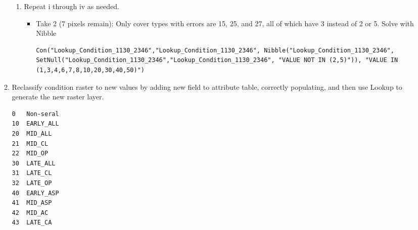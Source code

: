 \begin{enumerate}
\begin{enumerate}
\begin{enumerate}
            \item Repeat i through iv as needed.
            \begin{itemize}
            \item Take 2 (7 pixels remain): Only cover types with errors are 15, 25, and 27, all of which have 3 instead of 2 or 5. Solve with Nibble\begin{lstlisting}
Con("Lookup_Condition_1130_2346","Lookup_Condition_1130_2346", Nibble("Lookup_Condition_1130_2346", SetNull("Lookup_Condition_1130_2346","Lookup_Condition_1130_2346", "VALUE NOT IN (2,5)")), "VALUE IN (1,3,4,6,7,8,10,20,30,40,50)") \end{lstlisting}
            \end{itemize}
        \end{enumerate}  
        \item Reclassify condition raster to new values by adding new field to attribute table, correctly populating, and then use Lookup to generate the new raster layer.
        \begin{verbatim}
0   Non-seral
10  EARLY_ALL
20  MID_ALL
21  MID_CL
22  MID_OP
30  LATE_ALL
31  LATE_CL
32  LATE_OP
40  EARLY_ASP
41  MID_ASP
42  MID_AC
43  LATE_CA
\end{verbatim}  
    \end{enumerate}
\end{enumerate}

